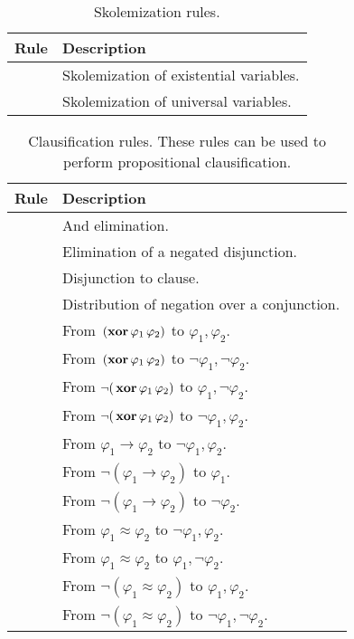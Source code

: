 \begin{xltabular}{\linewidth}{l X}
\caption{Skolemization rules.}
\label{rule-tab:skos}\\
  Rule & Description \\
  \hline
{} & Skolemization of existential variables. \\
 & Skolemization of universal variables. \\
\end{xltabular}

\begin{xltabular}{\linewidth}{l X}
\caption{Clausification rules.  These rules can be used to perform propositional
clausification.}
\label{rule-tab:clausification}\\
  Rule & Description \\
  \hline
{} & And elimination. \\
 & Elimination of a negated disjunction. \\
 & Disjunction to clause. \\
 & Distribution of negation over a conjunction. \\
 & From $\,(\mathbf{xor}\, \varphi_1\, \varphi_2)$ to $\varphi_1, \varphi_2$. \\
 & From $\,(\mathbf{xor}\, \varphi_1\, \varphi_2)$ to $\neg\varphi_1, \neg\varphi_2$. \\
 & From $\neg(\,\mathbf{xor}\, \varphi_1\, \varphi_2)$ to $\varphi_1, \neg\varphi_2$. \\
 & From $\neg(\,\mathbf{xor}\, \varphi_1\, \varphi_2)$ to $\neg\varphi_1, \varphi_2$. \\
 & From $ \varphi_1\rightarrow\varphi_2 $ to $\neg\varphi_1 , \varphi_2 $. \\
 & From $\neg (\varphi_1\rightarrow\varphi_2)$ to $\varphi_1$. \\
 & From $\neg (\varphi_1\rightarrow\varphi_2)$ to $\neg\varphi_2$. \\
 & From $ \varphi_1≈\varphi_2$ to $\neg\varphi_1 , \varphi_2$. \\
 & From $ \varphi_1≈\varphi_2$ to $\varphi_1 , \neg\varphi_2$. \\
 & From $\neg(\varphi_1≈\varphi_2)$ to $\varphi_1 , \varphi_2$. \\
 & From $\neg(\varphi_1≈\varphi_2)$ to $\neg\varphi_1 , \neg\varphi_2$. \\

\end{xltabular}
